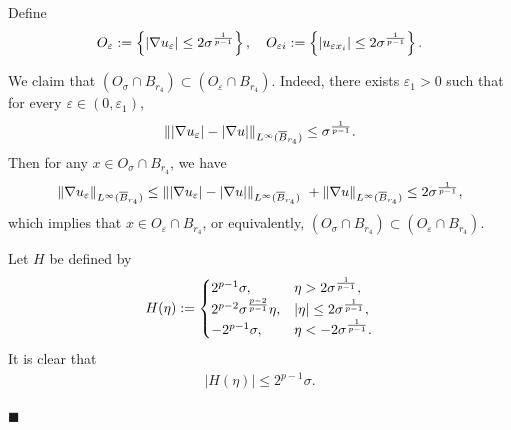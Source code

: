 \documentclass[onecolumn]{autart}
\newenvironment{proof}{{\it Proof: \enspace}}{\hfill $\blacksquare$\par}
\begin{document}
	\begin{proof}Define
		\begin{align}
			O_{\varepsilon}:=\left\{ |\nabla u_\varepsilon| \leq 2\sigma^{\frac{1}{p-1}}\right\},
			\quad
			O_{\varepsilon i}:=\left\{ |u_{\varepsilon x_i}| \leq 2\sigma^{\frac{1}{p-1}}\right\}.\notag
		\end{align}
		
		We claim that $(O_\sigma\cap B_{r_4})\subset(O_\varepsilon \cap B_{r_4})$.
		Indeed, there exists $\varepsilon_1>0$ such that for every $\varepsilon\in(0,\varepsilon_1)$,
		\begin{align}
			\left\| |\nabla u_\varepsilon| - |\nabla u|\right\| _{L^{\infty}(\overline{B}_{r_4})}\leq \sigma^{\frac{1}{p-1}}.\notag
		\end{align}
		Then for any $x\in O_{\sigma}\cap B_{r_4}$, we have
		\begin{align}
			\left\| \nabla u_\varepsilon\right\| _{L^{\infty}(\overline{B}_{r_4})}\leq 	\left\| |\nabla u_\varepsilon| - |\nabla u|\right\| _{L^{\infty}(\overline{B}_{r_4})}\ + 	\left\| \nabla u \right\| _{L^{\infty}(\overline{B}_{r_4})}\leq 2\sigma^{\frac{1}{p-1}},\notag
		\end{align}
		which implies that $x \in O_\varepsilon \cap B_{r_4}$, or equivalently, $(O_\sigma \cap B_{r_4}) \subset (O_\varepsilon \cap B_{r_4})$.
		
		Let $H$ be defined by
		\begin{align}
			H(\eta) :=
			\begin{cases}
				2^{p-1}\sigma, & \eta > 2\sigma^{\frac{1}{p-1}}, \\
				2^{p-2}\sigma^{\frac{p-2}{p-1}}\eta, & |\eta|\leq 2\sigma^{\frac{1}{p-1}}, \\
				-2^{p-1}\sigma, & \eta < -2\sigma^{\frac{1}{p-1}}.
			\end{cases}\notag
		\end{align}
		It is clear that
		\begin{align}\label{7.1}
			|H(\eta)|\leq2^{p-1}\sigma.
		\end{align}
		

\end{proof}
\end{document}

